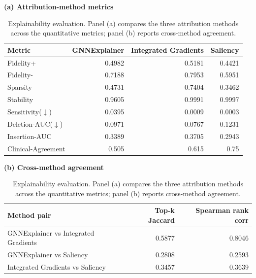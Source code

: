 \begin{table}[t]
\centering
\caption{Explainability evaluation. Panel (a) compares the three attribution methods across the quantitative metrics; panel (b) reports cross-method agreement.}
\label{tab:xai}
\label{tab:xai_agree}
\footnotesize
\textbf{(a) Attribution-method metrics}\\[2pt]
\begin{tabular}{lrrr}
\toprule
Metric & GNNExplainer & Integrated Gradients & Saliency \\
\midrule
Fidelity+ & 0.4982 & 0.5181 & 0.4421 \\
Fidelity- & 0.7188 & 0.7953 & 0.5951 \\
Sparsity & 0.4731 & 0.7404 & 0.3462 \\
Stability & 0.9605 & 0.9991 & 0.9997 \\
Sensitivity($\downarrow$) & 0.0395 & 0.0009 & 0.0003 \\
Deletion-AUC($\downarrow$) & 0.0971 & 0.0767 & 0.1231 \\
Insertion-AUC & 0.3389 & 0.3705 & 0.2943 \\
Clinical-Agreement & 0.505 & 0.615 & 0.75 \\
\bottomrule
\end{tabular}
\vspace{7pt}
\textbf{(b) Cross-method agreement}\\[2pt]
\begin{tabular}{lrr}
\toprule
Method pair & Top-k Jaccard & Spearman rank corr \\
\midrule
GNNExplainer vs Integrated Gradients & 0.5877 & 0.8046 \\
GNNExplainer vs Saliency & 0.2808 & 0.2593 \\
Integrated Gradients vs Saliency & 0.3457 & 0.3639 \\
\bottomrule
\end{tabular}
\end{table}
